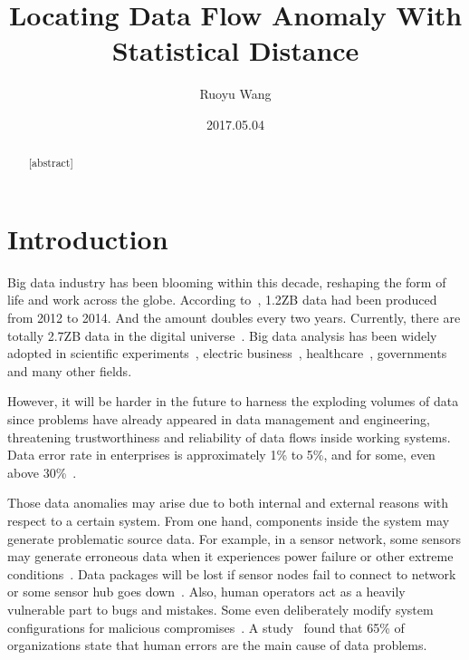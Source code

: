 \documentclass[a4paper]{IEEEtran}
\title{Locating Data Flow Anomaly With Statistical Distance}
\author{Ruoyu Wang}
\date{2017.05.04}
\begin{document}
	\maketitle
	
	\begin{abstract}
		[abstract]
	\end{abstract}
	
	\section{Introduction}
		Big data industry has been blooming within this decade, reshaping the form of life and work across the globe. According to~\autocite{letouze2014official}, 1.2ZB data had been produced from 2012 to 2014. And the amount doubles every two years. Currently, there are totally 2.7ZB data in the digital universe~\autocite{bigDataStatistics}. Big data analysis has been widely adopted in scientific experiments~\autocite{nothaft2015rethinking}, electric business~\autocite{bronson2015open,sumbaly2013big,chen2016realtime}, healthcare~\autocite{groves2016big}, governments~\autocite{kim2014big} and many other fields.
		
		However, it will be harder in the future to harness the exploding volumes of data since problems have already appeared in data management and engineering, threatening trustworthiness and reliability of data flows inside working systems. Data error rate in enterprises is approximately 1\% to 5\%, and for some, even above 30\%~\autocite{saha2014data}.
		
		Those data anomalies may arise due to both internal and external reasons with respect to a certain system. From one hand, components inside the system may generate problematic source data. For example, in a sensor network, some sensors may generate erroneous data when it experiences power failure or other extreme conditions~\autocite{rassam2014adaptive}. Data packages will be lost if sensor nodes fail to connect to network or some sensor hub goes down~\autocite{herodotou2014scalable}. Also, human operators act as a heavily vulnerable part to bugs and mistakes. Some even deliberately modify system configurations for malicious compromises~\autocite{schuster2015vc3}. A study~\autocite{humanError} found that 65\% of organizations state that human errors are the main  cause of data problems.
		
\end{document}
